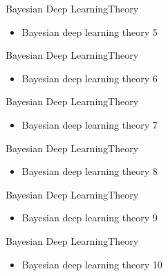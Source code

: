\documentclass[AERbeamer%
              ,optEnglish%
              ,optBiber%
              ,optBibstyleAlphabetic%
              ,optBeamerClassicFormat%
              ]{AERlatex}%
\begin{document}
\begin{frame}[c]{Bayesian Deep Learning}{Theory}
    \centering
    \begin{itemize}
        \item Bayesian deep learning theory 5
    \end{itemize}
\end{frame}


\begin{frame}[c]{Bayesian Deep Learning}{Theory}
    \centering
    \begin{itemize}
        \item Bayesian deep learning theory 6
    \end{itemize}
\end{frame}


\begin{frame}[c]{Bayesian Deep Learning}{Theory}
    \centering
    \begin{itemize}
        \item Bayesian deep learning theory 7
    \end{itemize}
\end{frame}


\begin{frame}[c]{Bayesian Deep Learning}{Theory}
    \centering
    \begin{itemize}
        \item Bayesian deep learning theory 8
    \end{itemize}
\end{frame}


\begin{frame}[c]{Bayesian Deep Learning}{Theory}
    \centering
    \begin{itemize}
        \item Bayesian deep learning theory 9
    \end{itemize}
\end{frame}


\begin{frame}[c]{Bayesian Deep Learning}{Theory}
    \centering
    \begin{itemize}
        \item Bayesian deep learning theory 10
    \end{itemize}
\end{frame}
\end{document}

